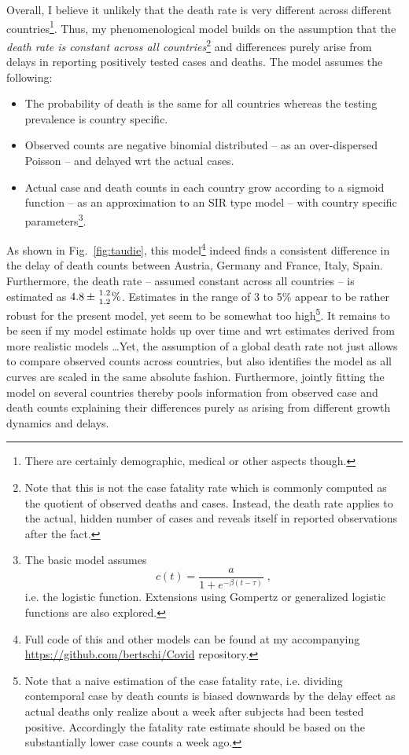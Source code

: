 \documentclass[a4paper]{tufte-handout}
\newcommand{\fig}[1]{Fig.~\ref{fig:#1}}
\begin{document}
Overall, I believe it unlikely that the death rate is very different
across different countries\footnote{There are certainly demographic,
  medical or other aspects though.}. Thus, my phenomenological model
builds on the assumption that the {\em death rate is constant across
  all countries}\footnote{Note that this is not the case fatality rate
  which is commonly computed as the quotient of observed deaths and
  cases. Instead, the death rate applies to the actual, hidden number
  of cases and reveals itself in reported observations after the
  fact.} and differences purely arise from delays in reporting
positively tested cases and deaths. The model assumes the following:
\begin{itemize}
\item The probability of death is the same for all countries whereas
  the testing prevalence is country specific.
\item Observed counts are negative binomial distributed -- as an
  over-dispersed Poisson -- and delayed wrt the actual cases.
\item Actual case and death counts in each country grow according to a
  sigmoid function -- as an approximation to an SIR type model -- with
  country specific parameters\footnote{The basic model assumes \[ c(t)
    = \frac{a}{1 + e^{- \beta (t - \tau)}} \; , \] i.e. the logistic
    function. Extensions using Gompertz or generalized logistic
    functions are also explored.}.
\end{itemize}

As shown in \fig{taudie}, this model\footnote{Full code of this and
  other models can be found at my accompanying
  \href{Github}{\url{https://github.com/bertschi/Covid}} repository.}
indeed finds a consistent difference in the delay of death counts
between Austria, Germany and France, Italy, Spain. Furthermore, the
death rate -- assumed constant across all countries -- is estimated as
$4.8 \pm {1.2 \atop 1.2} \%$. Estimates in the range of 3 to 5\%
appear to be rather robust for the present model, yet seem to be
somewhat too high\footnote{Note that a naive estimation of the case
  fatality rate, i.e. dividing contemporal case by death counts is
  biased downwards by the delay effect as actual deaths only realize
  about a week after subjects had been tested positive. Accordingly
  the fatality rate estimate should be based on the substantially
  lower case counts a week ago.}. It remains to be seen if my model
estimate holds up over time and wrt estimates derived from more
realistic models \ldots Yet, the assumption of a global death rate not
just allows to compare observed counts across countries, but also
identifies the model as all curves are scaled in the same absolute
fashion. Furthermore, jointly fitting the model on several countries
thereby pools information from observed case and death counts
explaining their differences purely as arising from different growth
dynamics and delays.
\end{document}
